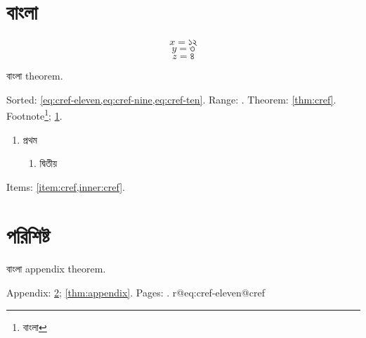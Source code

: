 \section{বাংলা}\label{sec:cref}
\setcounter{equation}{8}
\begin{equation}x=১২\label{eq:cref-nine}\end{equation}
\begin{equation}y=৩\label{eq:cref-ten}\end{equation}
\begin{equation}z=৪\label{eq:cref-eleven}\end{equation}
\begin{result}\label{thm:cref}বাংলা theorem.\end{result}
Sorted: \cref{eq:cref-eleven,eq:cref-nine,eq:cref-ten}.
Range: .
Theorem: \cref{thm:cref}.
Footnote\footnote{বাংলা\label{fn:cref}}; \cref{fn:cref}.
\begin{enumerate}
\item প্রথম\label{item:cref}
\begin{enumerate}\item দ্বিতীয়\label{inner:cref}\end{enumerate}
\end{enumerate}
Items: \cref{item:cref,inner:cref}.
\newpage
\appendix
\section{পরিশিষ্ট}\label{app:cref}
\begin{result}\label{thm:appendix}বাংলা appendix theorem.\end{result}
Appendix: \cref{app:cref}; \cref{thm:appendix}.
Pages: .
\makeatletter
\ifcsname r@eq:cref-eleven@cref\endcsname
{}
\fi
\makeatother

